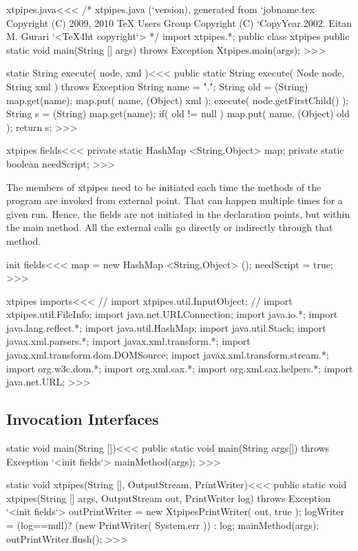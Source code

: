 \documentclass{article}
\begin{document}
{\<xtpipes.java\><<<
/* xtpipes.java (`version), generated from `jobname.tex
   Copyright (C) 2009, 2010 TeX Users Group
   Copyright (C) `CopyYear.2002. Eitan M. Gurari
`<TeX4ht copyright`> */
import xtpipes.*;
public class xtpipes {
  public static void main(String [] args) throws Exception {
    Xtpipes.main(args);
} }
>>>


\<static String execute( node, xml )\><<<
public static String execute( Node node, String xml )
                                      throws Exception {
  String name = ".";
  String old = (String) map.get(name);
  map.put( name, (Object) xml );
  execute( node.getFirstChild() );
  String s = (String) map.get(name);
  if( old != null ){ map.put( name, (Object) old ); }
  return s;
}
>>>







\<xtpipes fields\><<<
private static HashMap <String,Object> map;
private static boolean needScript;
>>>


The members of xtpipes need to be initiated each time the methods of
the program are invoked from external point.  That can happen multiple
times for a given run. Hence, the fields are not initiated in the
declaration points, but within the main method.  All the external
calls go directly or indirectly through that method.


\<init fields\><<<
map = new HashMap  <String,Object> ();
needScript = true;
>>>


\<xtpipes imports\><<<
// import xtpipes.util.InputObject;
// import xtpipes.util.FileInfo;
import java.net.URLConnection;
import java.io.*;
import java.lang.reflect.*;
import java.util.HashMap;
import java.util.Stack;
import javax.xml.parsers.*;
import javax.xml.transform.*;
import javax.xml.transform.dom.DOMSource;
import javax.xml.transform.stream.*;
import org.w3c.dom.*;
import org.xml.sax.*;
import org.xml.sax.helpers.*;
import java.net.URL;
>>>

\subsection{Invocation Interfaces}

\<static void main(String [])\><<<
public static void main(String args[]) throws Exception {
  `<init fields`>
  mainMethod(args);
}
>>>




\<static void xtpipes(String [], OutputStream, PrintWriter)\><<<
public static void xtpipes(String [] args,
                           OutputStream out,
                           PrintWriter log)
                                                throws Exception {
  `<init fields`>
  outPrintWriter = new XtpipesPrintWriter( out, true );
  logWriter = (log==null)? (new PrintWriter( System.err )) : log;
  mainMethod(args);
  outPrintWriter.flush();
}
>>>



}
\end{document}
